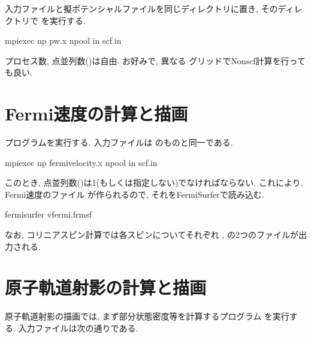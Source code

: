 \documentclass[letterpaper,10pt,dvipdfmx,openany]{sphinxmanual}
\begin{document}
\sphinxAtStartPar
入力ファイルと擬ポテンシャルファイルを同じディレクトリに置き,
そのディレクトリで  を実行する.

\begin{sphinxVerbatim}[commandchars=\\\{\}]
\PYGZdl{} mpiexec \PYGZhy{}np  pw.x \PYGZhy{}npool  \PYGZhy{}in scf.in
\end{sphinxVerbatim}

\sphinxAtStartPar
プロセス数,  点並列数()は自由.
お好みで, 異なる  グリッドでNon\sphinxhyphen{}scf計算を行っても良い.


\section{Fermi速度の計算と描画}
\label{\detokenize{qe:fermi}}
\sphinxAtStartPar
{} プログラムを実行する.
入力ファイルは  のものと同一である.

\begin{sphinxVerbatim}[commandchars=\\\{\}]
\PYGZdl{} mpiexec \PYGZhy{}np  fermi\PYGZus{}velocity.x \PYGZhy{}npool  \PYGZhy{}in scf.in
\end{sphinxVerbatim}

\sphinxAtStartPar
このとき,  点並列数()は1(もしくは指定しない)でなければならない.
これにより, Fermi速度のファイル  が作られるので,
それをFermiSurferで読み込む.

\begin{sphinxVerbatim}[commandchars=\\\{\}]
\PYGZdl{} fermisurfer vfermi.frmsf
\end{sphinxVerbatim}

\begin{figure}[htbp]
\centering

\noindent{}
\end{figure}

\sphinxAtStartPar
なお, コリニアスピン計算では各スピンについてそれぞれ , 
の2つのファイルが出力される.


\section{原子軌道射影の計算と描画}
\label{\detokenize{qe:id1}}
\sphinxAtStartPar
原子軌道射影の描画では, まず部分状態密度等を計算するプログラム
 を実行する.
入力ファイルは次の通りである.
\end{document}
